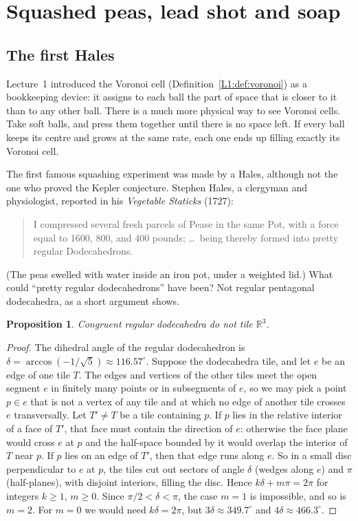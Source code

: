 \documentclass[11pt,openany]{book}
\theoremstyle{plain}
\newtheorem{proposition}[theorem]{Proposition}
\theoremstyle{definition}
\theoremstyle{remark}
\newcommand{\R}{\mathbb{R}}
\begin{document}
\section{Squashed peas, lead shot and soap}
\label{PHYS:sec:squash}

\subsection*{The first Hales}
Lecture~1 introduced the Voronoi cell (Definition~\ref{L1:def:voronoi}) as a bookkeeping device: it
assigns to each ball the part of space that is closer to it than to any other ball. There is a much
more physical way to see Voronoi cells. Take soft balls, and press them together until there is no
space left. If every ball keeps its centre and grows at the same rate, each one ends up filling exactly
its Voronoi cell.

The first famous squashing experiment was made by a Hales, although not the one who proved the
Kepler conjecture. Stephen Hales, a clergyman and physiologist, reported in his \emph{Vegetable
Staticks} (1727):
\begin{quote}\small
I compressed several fresh parcels of Pease in the same Pot, with a force equal to 1600, 800, and 400
pounds; \dots\ being thereby formed into pretty regular Dodecahedrons.
\end{quote}
(The peas swelled with water inside an iron pot, under a weighted lid.) What could ``pretty regular
dodecahedrons'' have been? Not regular pentagonal dodecahedra, as a short argument shows.

\begin{proposition}\label{PHYS:prop:dodec}
Congruent regular dodecahedra do not tile $\R^3$.
\end{proposition}

\begin{proof}
The dihedral angle of the regular dodecahedron is $\delta=\arccos(-1/\sqrt5)\approx116.57^\circ$.
Suppose the dodecahedra tile, and let $e$ be an edge of one tile $T$. The edges and vertices of the
other tiles meet the open segment $e$ in finitely many points or in subsegments of $e$, so we may pick
a point $p\in e$ that is not a vertex of any tile and at which no edge of another tile crosses $e$
transversally. Let $T'\ne T$ be a tile containing $p$. If $p$ lies in the relative interior of a face
of $T'$, that face must contain the direction of $e$: otherwise the face plane would cross $e$ at $p$
and the half-space bounded by it would overlap the interior of $T$ near $p$. If $p$ lies on an edge of
$T'$, then that edge runs along $e$. So in a small disc perpendicular to $e$ at $p$, the tiles cut out
sectors of angle $\delta$ (wedges along $e$) and $\pi$ (half-planes), with disjoint interiors, filling
the disc. Hence $k\delta+m\pi=2\pi$ for integers $k\ge1$, $m\ge0$. Since $\pi/2<\delta<\pi$, the case
$m=1$ is impossible, and so is $m=2$. For $m=0$ we would need $k\delta=2\pi$, but
$3\delta\approx349.7^\circ$ and $4\delta\approx466.3^\circ$.
\end{proof}
\end{document}
